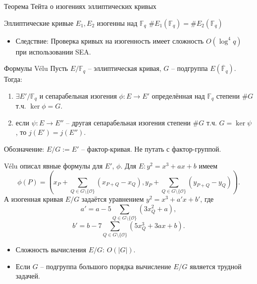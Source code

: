 \documentclass{beamer}
\begin{document}
\begin{frame}{Теорема Тейта о изогениях эллиптических кривых}
    \begin{center}
        Эллиптические кривые $E_1, E_2$ изогенны над $\mathbb{F}_q$ \structure{$\iff$} $\#E_1(\mathbb{F}_q) = \#E_2(\mathbb{F}_q)$
    \end{center}
    \begin{itemize}
        \item Следствие: Проверка кривых на изогенность имеет сложность $O(\log^4{q})$ при использовании SEA.
    \end{itemize}
\end{frame}

\begin{frame}{Формулы V\'{e}lu}
Пусть $E/\mathbb{F}_q$ -- эллиптическая кривая, $G$ -- подгруппа $E(\overline{\mathbb{F}}_q)$. Тогда:
\begin{enumerate}
    \item $\exists E'/\mathbb{F}_q$ и сепарабельная изогения $\phi: E \rightarrow E'$ определённая над $\mathbb{F}_q$ степени $\#G$ т.ч. $\ker\phi = G$.
    \item если $\psi: E \rightarrow E''$ -- другая сепарабельная изогения степени $\#G$ т.ч. $G = \ker\psi$, то $j(E') = j(E'')$.
\end{enumerate}
Обозначение: $E/G := E'$ -- фактор-кривая. Не путать с фактор-группой.
\end{frame}

\begin{frame}
V\'{e}lu описал явные формулы для $E'$, $\phi$. Для $E: y^2 = x^3 + a x + b$ имеем
\[
\phi(P)
=
\left(
  x_P + \sum_{Q \in G \setminus \{\mathcal{O}\}} \left( x_{P+Q} - x_Q \right),
  y_P + \sum_{Q \in G \setminus \{ \mathcal{O} \}} \left( y_{P+Q} - y_Q \right)
\right).
\]
А изогенная кривая $E/G$ задаётся уравнением $y^2 = x^3 + a' x + b'$, где
\[
a' = a - 5 \sum_{Q \in G \setminus \{ \mathcal{O} \}} \left( 3 x_Q^2 + a \right),
\]
\[
b' = b - 7 \sum_{Q \in G \setminus \{\mathcal{O}\}} \left(
5 x_Q^3 + 3 a x + b
\right).
\]
\end{frame}

\begin{frame}
\begin{itemize}
  \item Сложность вычисления $E/G$: $O(|G|)$.
  \item Если $G$ -- подгруппа большого порядка вычисление $E/G$ является трудной задачей.
\end{itemize}
\end{frame}
\end{document}
